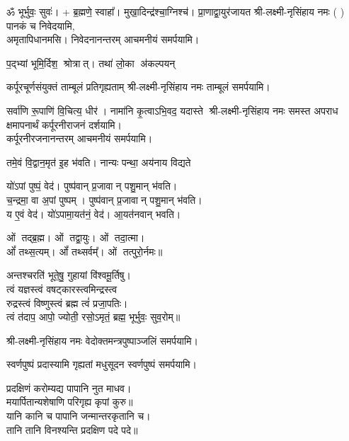 \begin{center}
ॐ भूर्भुवः॒ सुवः॑। + ब्र॒ह्मणे॒ स्वाहा᳚।
 {मुखा॒दिन्द्र॑श्चा॒ग्निश्च॑। प्रा॒णाद्वा॒युर॑जायत}
श्री-लक्ष्मी-नृसिंहाय नमः (	) पानकं   च   निवेदयामि, \\
अमृतापिधानमसि। निवेदनानन्तरम् आचमनीयं समर्पयामि।\medskip

{प॒द्भ्यां भूमि॒र्दिश॒ श्रोत्रात्। तथा॑ लो॒का अ॑कल्पयन्}

{कर्पूरचूर्णसंयुक्तं ताम्बूलं प्रतिगृह्यताम्}
श्री-लक्ष्मी-नृसिंहाय नमः ताम्बूलं समर्पयामि।\medskip

{सर्वा॑णि रू॒पाणि॑ वि॒चित्य॒ धीर॑। नामा॑नि कृ॒त्वाऽभि॒वद॒\an{} यदास्ते}
श्री-लक्ष्मी-नृसिंहाय नमः समस्त अपराध क्षमापनार्थं कर्पूरनीराजनं दर्शयामि।\\
कर्पूरनीरजनानन्तरम् आचमनीयं समर्पयामि।\medskip

 {तमे॒वं वि॒द्वान॒मृत॑ इ॒ह भ॑वति। नान्यः पन्था॒ अय॑नाय विद्यते}

 यो॑ऽपां पुष्पं॒ वेद॑। पुष्प॑वान् प्र॒जावान् पशु॒मान् भ॑वति।\\
च॒न्द्रमा॒ वा अ॒पां पुष्पम्। पुष्प॑वान् प्र॒जावान् पशु॒मान् भ॑वति।\\
य ए॒वं वेद॑। यो॑ऽपामा॒यत॑नं॒ वेद॑। आ॒यत॑नवान् भवति।\medskip

ओं तद्ब्र॒ह्म। ओं तद्वा॒युः। ओं तदा॒त्मा।\\ ओं᳚ तथ्स॒त्यम्‌।
ओं᳚ तथ्सर्वम्᳚‌। ओं तत्पुरो॒र्नमः॥\medskip

अन्तश्चरति॑ भूते॒षु॒ गुहायां वि॑श्वमू॒र्तिषु। \\
त्वं यज्ञस्त्वं वषट्कारस्त्वमिन्द्रस्त्व\\ रुद्रस्त्वं विष्णुस्त्वं ब्रह्म त्वं॑ प्रजा॒पतिः। \\
त्वं त॑दाप॒ आपो॒ ज्योती॒ रसो॒ऽमृतं॒ ब्रह्म॒ भूर्भुवः॒ सुव॒रोम्‌॥\medskip

\medskip

श्री-लक्ष्मी-नृसिंहाय नमः वेदोक्तमन्त्रपुष्पाञ्जलिं समर्पयामि।\medskip

{स्वर्णपुष्पं प्रदास्यामि गृह्यतां मधुसूदन}
स्वर्णपुष्पं समर्पयामि।\medskip

प्रदक्षिणं करोम्यद्य पापानि नुत माधव।\\
मयार्पितान्यशेषाणि परिगृह्य कृपां कुरु॥\\
 यानि कानि च पापानि जन्मान्तरकृतानि च।\\
तानि तानि विनश्यन्ति प्रदक्षिण पदे पदे॥\medskip


\end{center}
